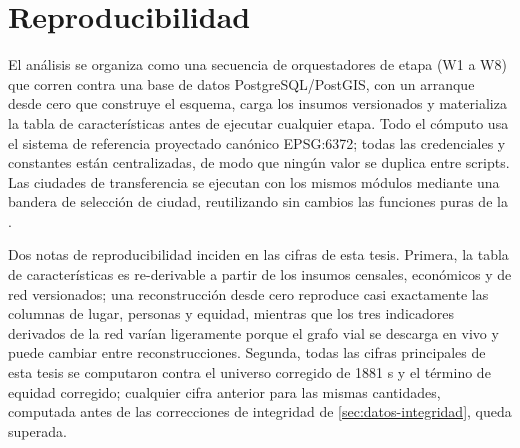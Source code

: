 \section{Reproducibilidad}
\label{app:reproducibilidad}

El análisis se organiza como una secuencia de orquestadores de etapa (W1 a W8) que corren
contra una base de datos PostgreSQL/PostGIS, con un arranque desde cero que construye el
esquema, carga los insumos versionados y materializa la tabla de características antes de
ejecutar cualquier etapa. Todo el cómputo usa el sistema de referencia proyectado canónico
EPSG:6372; todas las credenciales y constantes están centralizadas, de modo que ningún
valor se duplica entre scripts. Las ciudades de transferencia se ejecutan con los mismos
módulos mediante una bandera de selección de ciudad, reutilizando sin cambios las funciones
puras de la \zmg.

Dos notas de reproducibilidad inciden en las cifras de esta tesis. Primera, la tabla de
características es re-derivable a partir de los insumos censales, económicos y de red
versionados; una reconstrucción desde cero reproduce casi exactamente las columnas de
lugar, personas y equidad, mientras que los tres indicadores derivados de la red varían
ligeramente porque el grafo vial se descarga en vivo y puede cambiar entre reconstrucciones.
Segunda, todas las cifras principales de esta tesis se computaron contra el universo
corregido de \num{1881} \ageb{}s y el término de equidad corregido; cualquier cifra anterior
para las mismas cantidades, computada antes de las correcciones de integridad de
\cref{sec:datos-integridad}, queda superada.

